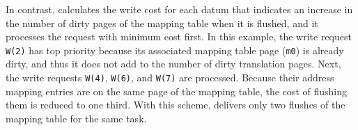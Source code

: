 In contrast, \ours{} calculates the write cost for each datum that indicates an
increase in the number of dirty pages of the mapping table when it is flushed,
and it processes the request with minimum cost first.  In this example, the
write request \texttt{W(2)} has top priority because its associated mapping
table page (\texttt{m0}) is already dirty, and thus it does not add to the number of dirty
translation pages.  Next, the write requests \texttt{W(4)},
\texttt{W(6)}, and \texttt{W(7)} are processed.  Because their address mapping
entries are on the same page of the mapping table, the cost of flushing
them is reduced to one third.  With this scheme, \ours{}
delivers only two flushes of the mapping table for the same task. 

\iffalse
